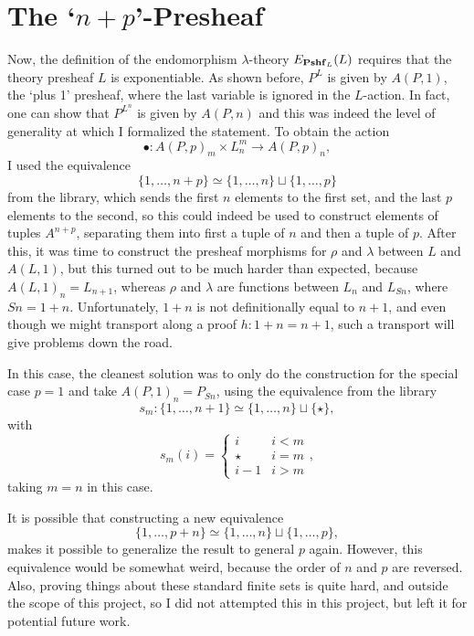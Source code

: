 \section{The `\texorpdfstring{$ n + p $}{n + p}'-Presheaf}
Now, the definition of the endomorphism $ \lambda $-theory $ E_{\mathbf{Pshf}_{L}}(L) $ requires that the theory presheaf $ L $ is exponentiable. As shown before, $ P^L $ is given by $ A(P, 1) $, the `plus 1' presheaf, where the last variable is ignored in the $ L $-action. In fact, one can show that $ P^{L^n} $ is given by $ A(P, n) $ and this was indeed the level of generality at which I formalized the statement. To obtain the action
\[ \bullet : A(P, p)_m \times L_n^m \to A(P, p)_n, \]
I used the equivalence
\[ \{ 1, \dots, n + p \} \simeq \{ 1, \dots, n \} \sqcup \{ 1, \dots, p \} \]
from the library, which sends the first $ n $ elements to the first set, and the last $ p $ elements to the second, so this could indeed be used to construct elements of tuples $ A^{n + p} $, separating them into first a tuple of $ n $ and then a tuple of $ p $. After this, it was time to construct the presheaf morphisms for $ \rho $ and $ \lambda $ between $ L $ and $ A(L, 1) $, but this turned out to be much harder than expected, because $ A(L, 1)_n = L_{n + 1} $, whereas $ \rho $ and $ \lambda $ are functions between $ L_n $ and $ L_{S n} $, where $ S n = 1 + n $. Unfortunately, $ 1 + n $ is not definitionally equal to $ n + 1 $, and even though we might transport along a proof $ h: 1 + n = n + 1 $, such a transport will give problems down the road.

In this case, the cleanest solution was to only do the construction for the special case $ p = 1 $ and take $ A(P, 1)_n = P_{S n} $, using the equivalence from the library
\[ s_m: \{ 1, \dots, n + 1 \} \simeq \{ 1, \dots, n \} \sqcup \{ \star \}, \]
with
\[ s_m(i) = \left\{ \begin{array}{cc}
    i & i < m\\
    \star & i = m\\
    i - 1 & i > m
\end{array}\right. ,  \]
taking $ m = n $ in this case.

It is possible that constructing a new equivalence
\[ \{ 1, \dots, p + n \} \simeq \{1, \dots, n\} \sqcup \{1, \dots, p\}, \]
makes it possible to generalize the result to general $ p $ again. However, this equivalence would be somewhat weird, because the order of $ n $ and $ p $ are reversed. Also, proving things about these standard finite sets is quite hard, and outside the scope of this project, so I did not attempted this in this project, but left it for potential future work.

